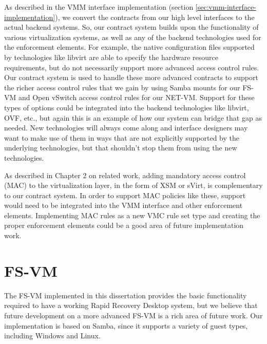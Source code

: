 As described in the VMM interface implementation (section \ref{sec:vmm-interface-implementation}), we convert the contracts from our high level interfaces to the actual backend systems. So, our contract system builds upon the functionality of various virtualization systems, as well as any of the backend technologies used for the enforcement elements. For example, the native configuration files supported by technologies like libvirt are able to specify the hardware resource requirements, but do not necessarily support more advanced access control rules. Our contract system is used to handle these more advanced contracts to support the richer access control rules that we gain by using Samba mounts for our FS-VM and Open vSwitch access control rules for our NET-VM. Support for these types of options could be integrated into the backend technologies like libvirt, OVF, etc., but again this is an example of how our system can bridge that gap as needed. New technologies will always come along and interface designers may want to make use of them in ways that are not explicitly supported by the underlying technologies, but that shouldn't stop them from using the new technologies.

As described in Chapter 2 on related work, adding mandatory access control (MAC) to the virtualization layer, in the form of XSM\cite{xsm_xen_summit_3rd} or sVirt\cite{sVirt_website}, is complementary to our contract system. In order to support MAC policies like these, support would need to be integrated into the VMM interface and other enforcement elements. Implementing MAC rules as a new VMC rule set type and creating the proper enforcement elements could be a good area of future implementation work.

\section{FS-VM}
\label{sec:fs-vm-implementation}

The FS-VM implemented in this dissertation provides the basic functionality required to have a working Rapid Recovery Desktop system, but we believe that future development on a more advanced FS-VM is a rich area of future work. Our implementation is based on Samba, since it supports a variety of guest types, including Windows and Linux. 

